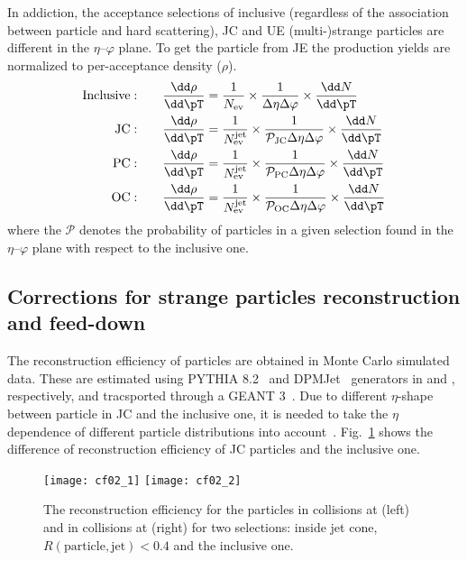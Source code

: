 In addiction, the acceptance selections of inclusive (regardless of the association between particle and hard scattering), JC and UE (multi-)strange particles are different in the $\eta$--$\varphi$ plane. To get the particle from JE the production yields are normalized to per-acceptance density ($\rho$).
\begin{equation}
\begin{split}
{\rm Inclusive:}\qquad & \frac{\dd\rho}{\dd\pT} = \frac{1}{N_{\rm ev}}\times\frac{1}{\Delta\eta\Delta\varphi}\times\frac{\dd N}{\dd\pT} \\
{\rm JC:}\qquad & \frac{\dd\rho}{\dd\pT} = \frac{1}{N_{\rm ev}^{\rm jet}} \times\frac{1}{\mathcal{P}_{\rm JC}\Delta\eta\Delta\varphi}\times\frac{\dd N}{\dd\pT} \\
{\rm PC:}\qquad & \frac{\dd\rho}{\dd\pT} = \frac{1}{N_{\rm ev}^{\rm jet}} \times\frac{1}{\mathcal{P}_{\rm PC}\Delta\eta\Delta\varphi}\times\frac{\dd N}{\dd\pT} \\
{\rm OC:}\qquad & \frac{\dd\rho}{\dd\pT} = \frac{1}{N_{\rm ev}^{\rm jet}} \times\frac{1}{\mathcal{P}_{\rm OC}\Delta\eta\Delta\varphi}\times\frac{\dd N}{\dd\pT} \\
\end{split}
\label{eq:normalize}
\end{equation}
where the $\mathcal{P}$ denotes the probability of particles in a given selection found in the $\eta$--$\varphi$ plane with respect to the inclusive one.

\subsection{Corrections for strange particles reconstruction and feed-down}
\label{SubSec:Correction}
The reconstruction efficiency of particles are obtained in Monte Carlo simulated data. These are estimated using PYTHIA 8.2~\cite{Sjostrand:2014zea} and DPMJet~\cite{Roesler:2000he} generators in \pp and \pPb, respectively, and tracsported through a GEANT 3~\cite{Brun:1994aa}. Due to different $\eta$-shape between particle in JC and the inclusive one, it is needed to take the $\eta$ dependence of different particle distributions into account~\cite{V0injet}. Fig.~\ref{fig:EffiJCIncl} shows the difference of reconstruction efficiency of JC particles and the inclusive one. 
\begin{figure}[!ht]
	\begin{center}
		\texttt{[image: cf02\_1]}
		\texttt{[image: cf02\_2]}
	\end{center}
	\caption{The reconstruction efficiency for the particles in \pp collisions at \thirteen (left) and in \pPb collisions at \fivenn (right) for two selections: inside jet cone, $R(\mathrm{particle, jet}) < 0.4$ and the inclusive one.}
	\label{fig:EffiJCIncl}
\end{figure}

